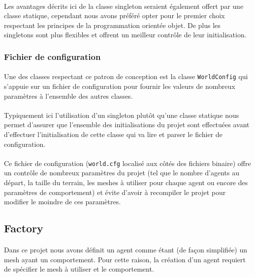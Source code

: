 \paragraph{}
Les avantages décrits ici de la classe singleton seraient également offert par
une classe statique, cependant nous avons préféré opter pour le premier choix
respectant les principes de la programmation orientée objet. De plus les
singletons sont plus flexibles et offrent un meilleur contrôle de leur
initialisation.

\subsubsection{Fichier de configuration}

\paragraph{}
Une des classes respectant ce patron de conception est la classe
\verb!WorldConfig! qui s'appuie sur un fichier de configuration pour fournir
les valeurs de nombreux paramètres à l'ensemble des autres classes.

\paragraph{}
Typiquement ici l'utilisation d'un singleton plutôt qu'une classe statique
nous permet d'assurer que l'ensemble des initialisations du projet sont
effectuées avant d'effectuer l'initialisation de cette classe qui va lire et
parser le fichier de configuration.

\paragraph{}
Ce fichier de configuration (\verb!world.cfg! localisé aux côtés des fichiers
binaire) offre un contrôle de nombreux paramètres du projet (tel que le nombre
d'agents au départ, la taille du terrain, les meshes à utiliser pour chaque
agent ou encore des paramètres de comportement) et évite d'avoir à recompiler
le projet pour modifier le moindre de ces paramètres.


\subsection{Factory}
\paragraph{}
Dans ce projet nous avons définit un agent comme étant (de façon simplifiée)
un mesh ayant un comportement. Pour cette raison, la création d'un agent
requiert de spécifier le mesh à utiliser et le comportement.

